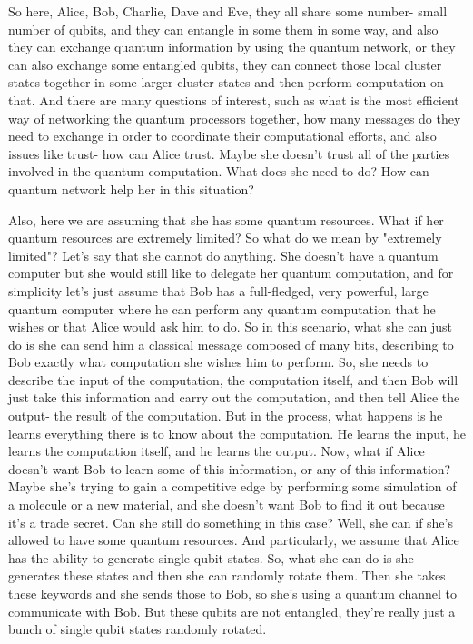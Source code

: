 So here, Alice, Bob, Charlie, Dave and Eve, they all share some number- small number of qubits, and they can entangle in some them in some way, and also they can exchange quantum information by using the quantum network, or they can also exchange some entangled qubits, they can connect those local cluster states together in some larger cluster states and then perform computation on that. And there are many questions of interest, such as what is the most efficient way of networking the quantum processors together, how many messages do they need to exchange in order to coordinate their computational efforts, and also issues like trust- how can Alice trust. Maybe she doesn't trust all of the parties involved in the quantum computation. What does she need to do? How can quantum network help her in this situation?

Also, here we are assuming that she has some quantum resources. What if her quantum resources are extremely limited? So what do we mean by "extremely limited"? Let's say that she cannot do anything. She doesn't have a quantum computer but she would still like to delegate her quantum computation, and for simplicity let's just assume that Bob has a full-fledged, very powerful, large quantum computer where he can perform any quantum computation that he wishes or that Alice would ask him to do. So in this scenario, what she can just do is she can send him a classical message composed of many bits, describing to Bob exactly what computation she wishes him to perform. So, she needs to describe the input of the computation, the computation itself, and then Bob will just take this information and carry out the computation, and then tell Alice the output- the result of the computation. But in the process, what happens is he learns everything there is to know about the computation. He learns the input, he learns the computation itself, and he learns the output. Now, what if Alice doesn't want Bob to learn some of this information, or any of this information? Maybe she's trying to gain a competitive edge by performing some simulation of a molecule or a new material, and she doesn't want Bob to find it out because it's a trade secret. Can she still do something in this case? Well, she can if she's allowed to have some quantum resources. And particularly, we assume that Alice has the ability to generate single qubit states. So, what she can do is she generates these states and then she can randomly rotate them. Then she takes these keywords and she sends those to Bob, so she's using a quantum channel to communicate with Bob. But these qubits are not entangled, they're really just a bunch of single qubit states randomly rotated.

